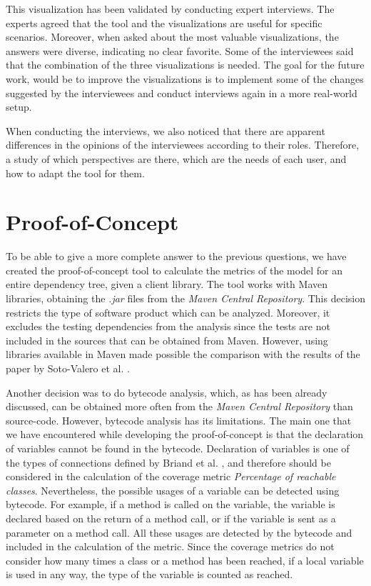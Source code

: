 This visualization has been validated by conducting expert interviews. The experts agreed that the tool and the visualizations are useful for specific scenarios. Moreover, when asked about the most valuable visualizations, the answers were diverse, indicating no clear favorite. Some of the interviewees said that the combination of the three visualizations is needed. The goal for the future work, would be to improve the visualizations is to implement some of the changes suggested by the interviewees and conduct interviews again in a more real-world setup.

When conducting the interviews, we also noticed that there are apparent differences in the opinions of the interviewees according to their roles. Therefore, a study of which perspectives are there, which are the needs of each user, and how to adapt the tool for them.

\section{Proof-of-Concept}

To be able to give a more complete answer to the previous questions, we have created the proof-of-concept tool to calculate the metrics of the model for an entire dependency tree, given a client library. The tool works with Maven libraries, obtaining the \textit{.jar} files from the \textit{Maven Central Repository}. This decision restricts the type of software product which can be analyzed. Moreover, it excludes the testing dependencies from the analysis since the tests are not included in the sources that can be obtained from Maven. However, using libraries available in Maven made possible the comparison with the results of the paper by Soto-Valero et al. \cite{soto2020comprehensive}.

Another decision was to do bytecode analysis, which, as has been already discussed, can be obtained more often from the \textit{Maven Central Repository} than source-code. However, bytecode analysis has its limitations. The main one that we have encountered while developing the proof-of-concept is that the declaration of variables cannot be found in the bytecode. Declaration of variables is one of the types of connections defined by Briand et al. \cite{briand1999unified}, and therefore should be considered in the calculation of the coverage metric \textit{Percentage of reachable classes}. Nevertheless, the possible usages of a variable can be detected using bytecode. For example, if a method is called on the variable, the variable is declared based on the return of a method call, or if the variable is sent as a parameter on a method call. All these usages are detected by the bytecode and included in the calculation of the metric. Since the coverage metrics do not consider how many times a class or a method has been reached, if a local variable is used in any way, the type of the variable is counted as reached.
